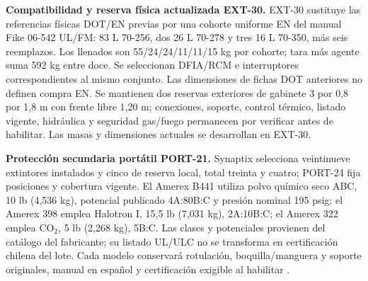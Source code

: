 \textbf{Compatibilidad y reserva física actualizada EXT-30.}\label{sec:sd4-ext21}
EXT-30 sustituye las referencias físicas DOT/EN previas por una cohorte uniforme EN del manual Fike 06-542 UL/FM: 83 L 70-256, dos 26 L 70-278 y tres 16 L 70-350, más seis reemplazos. Los llenados son 55/24/24/11/11/15 kg por cohorte; tara más agente suma 592 kg entre doce. Se seleccionan DFIA/RCM e interruptores correspondientes al mismo conjunto. Las dimensiones de fichas DOT anteriores no definen compra EN. Se mantienen dos reservas exteriores de gabinete 3 por 0,8 por 1,8 m con frente libre 1,20 m; conexiones, soporte, control térmico, listado vigente, hidráulica y seguridad gas/fuego permanecen por verificar antes de habilitar. Las masas y dimensiones actuales se desarrollan en EXT-30.

\textbf{Protección secundaria portátil PORT-21.}\label{sec:sd4-port21}
Synaptix selecciona veintinueve extintores instalados y cinco de reserva local, total treinta y cuatro; PORT-24 fija posiciones y cobertura vigente. El Amerex B441 utiliza polvo químico seco ABC, 10 lb (4,536 kg), potencial publicado 4A:80B:C y presión nominal 195 psig; el Amerex 398 emplea Halotron I, 15,5 lb (7,031 kg), 2A:10B:C; el Amerex 322 emplea CO$_2$, 5 lb (2,268 kg), 5B:C. Las clases y potenciales provienen del catálogo del fabricante; su listado UL/ULC no se transforma en certificación chilena del lote. Cada modelo conservará rotulación, boquilla/manguera y soporte originales, manual en español y certificación exigible al habilitar \parencite[pp.~9, 11--12]{l21-amerex}.

